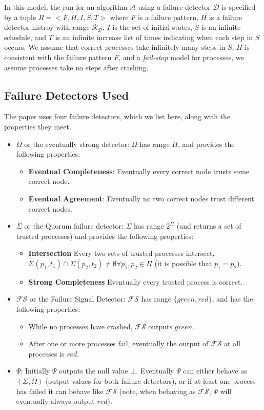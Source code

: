 In this model, the run for an algorithm $\mathcal{A}$ using a failure detector $\mathcal{D}$ is specified by a tuple $R
= <F, H, I, S, T>$ where $F$ is a failure pattern, $H$ is a failure detector histroy with range
$\mathcal{R}_{\mathcal{D}}$, $I$ is the set of initial states, $S$ is an infinite schedule, and $T$ is an infinite
increase list of times indicating when each step in $S$ occurs. We assume that correct processes take infinitely many
steps in $S$, $H$ is consistent with the failure pattern $F$, and a \emph{fail-stop} model for processes, \ie we assume
processes take no steps after crashing.

\subsection{Failure Detectors Used}
The paper uses four failure detectors, which we list here, along with the properties they meet.
\begin{itemize}
\item \textbf{$\Omega$} or the eventually strong detector: $\Omega$ has range $\Pi$, and provides the
following properties:
\begin{itemize}
\item \textbf{Eventual Completeness}: Eventually every correct node trusts some correct node.
\item \textbf{Eventual Agreement}: Eventually no two correct nodes trust different correct nodes.
\end{itemize}
\item \textbf{$\Sigma$} or the Quorum failure detector: $\Sigma$ has range $2^{\Pi}$ (and returns a set of trusted
processes)  and provides the following properties:
\begin{itemize}
\item \textbf{Intersection} Every two sets of trusted processes intersect, \ie $\Sigma(p_1, t_1) \cap \Sigma(p_2, t_2)
\neq \emptyset \forall p_1, p_2 \in \Pi$ (it is possible that $p_1 = p_2$).
\item \textbf{Strong Completeness} Eventually every trusted process is correct.
\end{itemize}
\item \textbf{$\mathcal{FS}$} or the Failure Signal Detector: $\mathcal{FS}$ has range $\{green, red\}$, and has the
following properties:
\begin{itemize}
\item While no processes have crashed, $\mathcal{FS}$ outputs $green$.
\item After one or more processes fail, eventually the output of $\mathcal{FS}$ at all processes is $red$.
\end{itemize}
\item \textbf{$\Psi$}: Initially $\Psi$ outputs the null value $\bot$. Eventually $\Psi$ can either behave as
$(\Sigma, \Omega)$ (\ie output values for both failure detectors), or if at least one process has failed it
can behave like $\mathcal{FS}$ (note, when behaving as $\mathcal{FS}$, $\Psi$ will eventually always output $red$).
\end{itemize}

